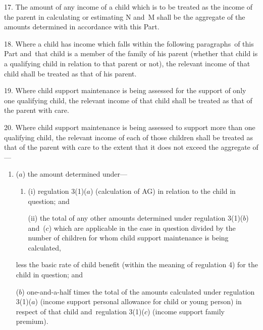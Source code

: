 \documentclass[12pt,a4paper]{article}
\begin{document}
17.  The amount of any income of a child which is to be treated as the income of the parent in calculating or estimating N and~M shall be the aggregate of the amounts determined in accordance with this Part.

\medskip

18.  Where a child has income which falls within the following paragraphs~of this Part and~that child is a member of the family of his parent (whether that child is a qualifying child in relation to that parent or not), the relevant income of that child shall be treated as that of his parent.

\medskip

19.  Where child support maintenance is being assessed for the support of only one qualifying child, the relevant income of that child shall be treated as that of the parent with care.

\medskip

20.  Where child support maintenance is being assessed to support more than one qualifying child, the relevant income of each of those children shall be treated as that of the parent with care to the extent that it does not exceed the aggregate of—
\begin{enumerate}\item[]
($a$) the amount determined under—
\begin{enumerate}\item[]
(i) regulation 3(1)($a$) (calculation of AG) in relation to the child in question; and

(ii) the total of any other amounts determined under regulation 3(1)($b$) 
and~($c$)  %
which are applicable in the case in question divided by the number of children for whom child support maintenance is being calculated,
\end{enumerate}
less the basic rate of child benefit (within the meaning of regulation 4) for the child in question; and

($b$) 
one-and-a-half times  %
the total of the amounts calculated under regulation 3(1)($a$) (income support personal allowance for child or young person) in respect of that child and~regulation 
3(1)($c$)  %
(income support family premium).
\end{enumerate}
\end{document}
